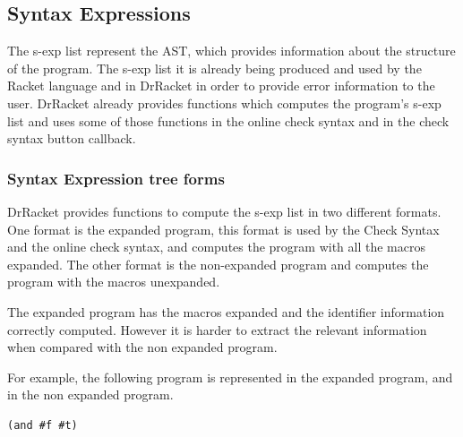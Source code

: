 
\subsection{Syntax Expressions}
The s-exp list represent the AST, which provides information about
the structure of the program.
The s-exp list it is already being produced and used by the Racket language and
in DrRacket in order to provide error information to the user.
DrRacket already provides functions which computes the program's s-exp list and uses some of those
functions in the online check syntax and in the check syntax button callback.



\subsubsection{Syntax Expression tree forms}
DrRacket provides functions to compute the s-exp list in two different formats.
One format is the expanded program, this format is used by the Check Syntax and
the online check syntax, and computes the program with all the macros expanded. %
The other format is the non-expanded program and computes the program with the macros
unexpanded.

The expanded program has the macros expanded and the identifier information correctly
computed.
However it is harder to extract the relevant information when compared with the
non expanded program.

For example, the following program is represented in the expanded program,
and in the non expanded program. %

\begin{lstlisting}[basicstyle=\ttfamily, caption="example"]
(and #f #t)
\end{lstlisting}


